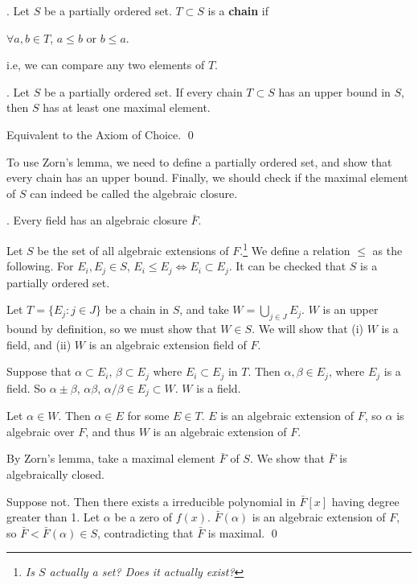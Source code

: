 .  Let \(S\) be a partially ordered set. \(T \subset S\) is a \textbf{chain} if
\begin{center}
    \(\forall a, b \in T\), \(a \leq b\) or \(b \leq a\).
\end{center}
i.e, we can compare any two elements of \(T\).

\lemma.  Let \(S\) be a partially ordered set. If every chain \(T \subset S\) has an upper bound in \(S\), then \(S\) has at least one maximal element.

\pf Equivalent to the Axiom of Choice. \qed

To use Zorn's lemma, we need to define a partially ordered set, and show that every chain has an upper bound. Finally, we should check if the maximal element of \(S\) can indeed be called the algebraic closure.

\thm. Every field has an algebraic closure \(\bar{F}\).

\pf Let \(S\) be the set of all algebraic extensions of \(F\).\footnote{\textit{Is \(S\) actually a set? Does it actually exist?}} We define a relation \(\leq\) as the following. For \(E_i, E_j \in S\), \(E_i \leq E_j \iff E_i \subset E_j\). It can be checked that \(S\) is a partially ordered set.

Let \(T = \{E_j : j \in J\}\) be a chain in \(S\), and take \(W = \bigcup_{j \in J} E_j\). \(W\) is an upper bound by definition, so we must show that \(W \in S\). We will show that (i) \(W\) is a field, and (ii) \(W\) is an algebraic extension field of \(F\).

 Suppose that \(\alpha \subset E_i\), \(\beta \subset E_j\) where \(E_i \subset E_j\) in \(T\). Then \(\alpha, \beta \in E_j\), where \(E_j\) is a field. So \(\alpha \pm \beta\), \(\alpha\beta\), \(\alpha / \beta \in E_j \subset W\). \(W\) is a field.

 Let \(\alpha \in W\). Then \(\alpha \in E\) for some \(E \in T\). \(E\) is an algebraic extension of \(F\), so \(\alpha\) is algebraic over \(F\), and thus \(W\) is an algebraic extension of \(F\).

By Zorn's lemma, take a maximal element \(\bar{F}\) of \(S\). We show that \(\bar{F}\) is algebraically closed.

Suppose not. Then there exists a irreducible polynomial in \(\bar{F}[x]\) having degree greater than 1. Let \(\alpha\) be a zero of \(f(x)\). \(\bar{F}(\alpha)\) is an algebraic extension of \(F\), so \(\bar{F} < \bar{F}(\alpha) \in S\), contradicting that \(\bar{F}\) is maximal. \qed

